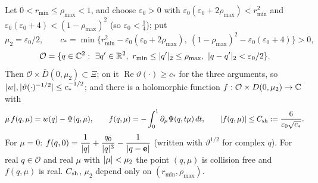 \begin{lemma}\label{bpI:p7:shift}
Let $0<r_{\min}\le\rho_{\max}<1$, and choose $\varepsilon_0>0$ with $\varepsilon_0(\varepsilon_0+2\rho_{\max})<r_{\min}^2$ and $\varepsilon_0(\varepsilon_0+4)<(1-\rho_{\max})^2$ (so $\varepsilon_0<\tfrac14$); put
\[
\mu_2=\varepsilon_0/2,\qquad c_*=\min\{r_{\min}^2-\varepsilon_0(\varepsilon_0+2\rho_{\max}),\ (1-\rho_{\max})^2-\varepsilon_0(\varepsilon_0+4)\}>0,
\]
\[
\mathcal O=\{q\in\C^2:\ \exists q'\in\R^2,\ r_{\min}\le\abs{q'}_2\le\rho_{\max},\ \abs{q-q'}_2<\varepsilon_0/2\}.
\]
Then $\mathcal O\times\bar D(0,\mu_2)\subset\Xi$; on it $\operatorname{Re}\vartheta(\cdot)\ge c_*$ for the three arguments, so $\lvert w\rvert,\lvert \vartheta(\cdot)^{-1/2}\rvert\le c_*^{-1/2}$; and there is a holomorphic function $f:\mathcal O\times D(0,\mu_2)\to\mathbb{C}$ with
\[
\mu\,f(q,\mu)=w(q)-\Psi(q,\mu),\qquad f(q,\mu)=-\int_0^1\partial_\mu\Psi(q,t\mu)\,dt,\qquad\lvert f(q,\mu)\rvert\le C_{\rm sh}:=\frac{6}{\varepsilon_0\sqrt{c_*}}.
\]
For $\mu=0$: $f(q,0)=\dfrac1{\lvert q\rvert}+\dfrac{q_0}{\lvert q\rvert^3}-\dfrac1{\lvert q-\mathbf e\rvert}$ (written with $\vartheta^{1/2}$ for complex $q$). For real $q\in\mathcal O$ and real $\mu$ with $\lvert \mu\rvert<\mu_2$ the point $(q,\mu)$ is collision free and $f(q,\mu)$ is real. $C_{\rm sh}$, $\mu_2$ depend only on $(r_{\min},\rho_{\max})$.
\end{lemma}
